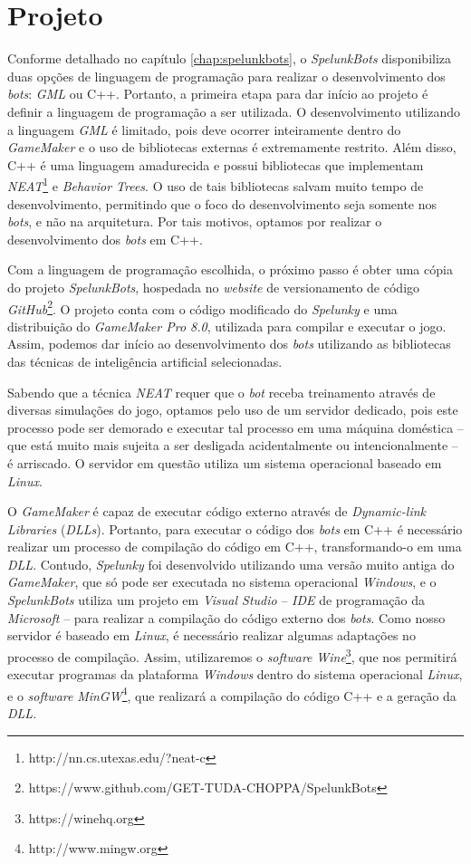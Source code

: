 \chapter{\label{chap:project}Projeto}
Conforme detalhado no capítulo \ref{chap:spelunkbots}, o \textit{SpelunkBots}
disponibiliza duas opções de linguagem de programação para realizar o
desenvolvimento dos \textit{bots}: \textit{GML} ou C++. Portanto, a primeira
etapa para dar início ao projeto é definir a linguagem de programação a ser
utilizada. O desenvolvimento utilizando a linguagem \textit{GML} é limitado,
pois deve ocorrer inteiramente dentro do \textit{GameMaker} e o uso de
bibliotecas externas é extremamente restrito. Além disso, C++ é uma linguagem
amadurecida e possui bibliotecas que implementam
\textit{NEAT}\footnote{http://nn.cs.utexas.edu/?neat-c} e \textit{Behavior
Trees}. O uso de tais bibliotecas salvam muito tempo de desenvolvimento,
permitindo que o foco do desenvolvimento seja somente nos \textit{bots}, e não
na arquitetura. Por tais motivos, optamos por realizar o desenvolvimento dos
\textit{bots} em C++.

Com a linguagem de programação escolhida, o próximo passo é obter uma cópia do
projeto \textit{SpelunkBots}, hospedada no \textit{website} de versionamento de
código
\textit{GitHub}\footnote{https://www.github.com/GET-TUDA-CHOPPA/SpelunkBots}. O
projeto conta com o código modificado do \textit{Spelunky} e uma distribuição do
\textit{GameMaker Pro 8.0}, utilizada para compilar e executar o jogo. Assim,
podemos dar início ao desenvolvimento dos \textit{bots} utilizando as bibliotecas
das técnicas de inteligência artificial selecionadas.

Sabendo que a técnica \textit{NEAT} requer que o \textit{bot} receba treinamento
através de diversas simulações do jogo, optamos pelo uso de um servidor
dedicado, pois este processo pode ser demorado e executar tal processo em uma
máquina doméstica -- que está muito mais sujeita a ser desligada acidentalmente
ou intencionalmente -- é arriscado. O servidor em questão utiliza um sistema
operacional baseado em \textit{Linux}.

O \textit{GameMaker} é capaz de executar código externo através de
\textit{Dynamic-link Libraries} (\textit{DLLs}). Portanto, para executar o
código dos \textit{bots} em C++ é necessário realizar um processo de compilação
do código em C++, transformando-o em uma \textit{DLL}. Contudo,
\textit{Spelunky} foi desenvolvido utilizando uma versão muito antiga do
\textit{GameMaker}, que só pode ser executada no sistema operacional
\textit{Windows}, e o \textit{SpelunkBots} utiliza um projeto em
\textit{Visual Studio} -- \textit{IDE} de programação da \textit{Microsoft}
-- para realizar a compilação do código externo dos \textit{bots}. Como
nosso servidor é baseado em \textit{Linux}, é necessário realizar algumas
adaptações no processo de compilação. Assim, utilizaremos o \textit{software}
\textit{Wine}\footnote{https://winehq.org}, que nos permitirá executar programas
da plataforma \textit{Windows} dentro do sistema operacional \textit{Linux}, e o
\textit{software} \textit{MinGW}\footnote{http://www.mingw.org}, que realizará a
compilação do código C++ e a geração da \textit{DLL}.

